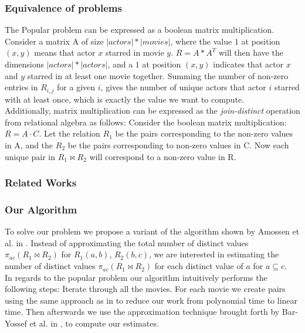 \documentclass[a4paper,11pt]{article}
\begin{document}
\subsubsection{Equivalence of problems}
The Popular problem can be expressed as a boolean matrix multiplication. Consider a matrix A of size $|actors|*|movies|$, where the value $1$ at position $(x, y)$ means that actor $x$ starred in movie $y$. $R = A * A^T$ will then have the dimensions $|actors|*|actors|$, and a $1$ at position $(x, y)$ indicates that actor $x$ and $y$ starred in at least one movie together. Summing the number of non-zero entries in $R_{i,j}$ for a given $i$, gives the number of unique actors that actor $i$ starred with at least once, which is exactly the value we want to compute.\\
Additionally, matrix multiplication can be expressed as the \emph{join-distinct} operation from relational algebra as follows: Consider the boolean matrix multiplication: $R = A \cdot C$. Let the relation $R_1$ be the pairs corresponding to the non-zero values in A, and the $R_2$ be the pairs corresponding to non-zero values in C. Now each unique pair in $R_1 \Join R_2$ will correspond to a non-zero value in R.


\subsubsection{Related Works}

\subsubsection{Our Algorithm}
To solve our problem we propose a variant of the algorithm shown by Amossen et al. in \cite{paper:Amossen}. Instead of approximating the total number of distinct values $\pi_{ac}(R_1 \Join R_2)$ for $R_1(a,b)$, $R_2(b,c)$, we are interested in estimating the number of distinct values $\pi_{ac}(R_1 \Join R_2)$ for each distinct value of $a$ for $a \subseteq c$.\\ %
In regards to the popular problem our algorithm intuitively performs the following steps: Iterate through all the movies. For each movie we create pairs using the same approach as in \cite{paper:Amossen} to reduce our work from polynomial time to linear time. Then afterwards we use the approximation technique brought forth by Bar-Yossef et al. in \cite{paper:Bar-Yossef}, to compute our estimates.
\end{document}
